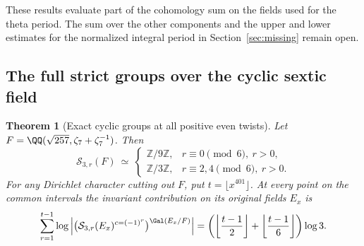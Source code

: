 \documentclass[a4paper,11pt]{article}
\newtheorem{theorem}[proposition]{Theorem}
\theoremstyle{definition}
\theoremstyle{remark}
\newcommand{\ZZ}{\mathbb Z}\newcommand{\ord}{\operatorname{ord}}
\numberwithin{equation}{section}
\begin{document}
These results evaluate part of the cohomology sum on the fields
used for the theta period. The sum over the other components and
the upper and lower estimates for the normalized integral period
in Section~\ref{sec:missing} remain open.

\subsection{The full strict groups over the cyclic sextic field}\label{nav:I-63}
\begin{theorem}[Exact cyclic groups at all positive even twists]\leavevmode
\label{thm:orders279}
Let \(F=\QQ(\sqrt{257},\zeta_7+\zeta_7^{-1})\). Then
\[
  \mathcal S_{3,r}(F)\ \simeq\
    \begin{cases}
       \ZZ/9\ZZ,& r\equiv0\pmod6,\ r>0,\\
       \ZZ/3\ZZ,& r\equiv2,4\pmod6,\ r>0.
    \end{cases}
\]
For any Dirichlet character cutting out \(F\), put
\(t=\lfloor x^{401}\rfloor\). At every point on the common
intervals the invariant contribution on its original fields \(E_x\) is
\[
 \sum_{r=1}^{t-1}
       \log\left|
       \bigl(\mathcal S_{3,r}(E_x)^{c=(-1)^r}\bigr)^{\Gal(E_x/F)}
       \right|
       =\left(\left\lfloor\frac{t-1}{2}\right\rfloor+
              \left\lfloor\frac{t-1}{6}\right\rfloor\right)\log3 .
\]
\end{theorem}
\end{document}
